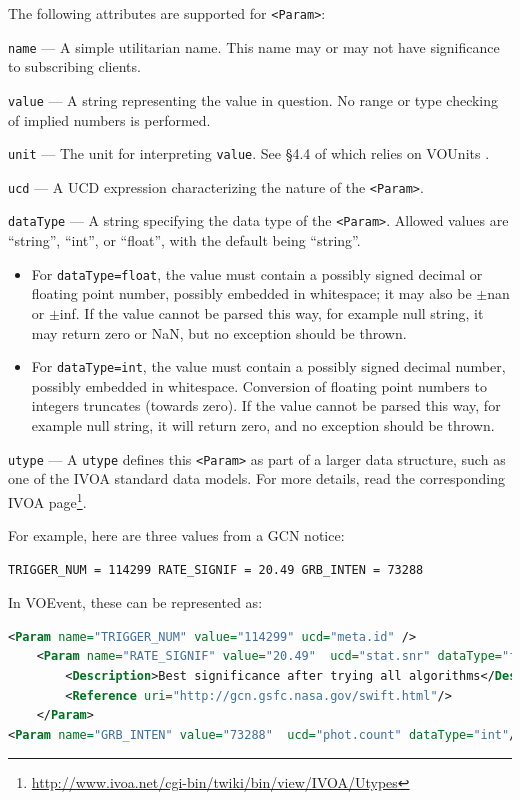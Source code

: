 \documentclass[11pt,a4paper]{ivoa}
\begin{document}
The following attributes are supported for {\tt <Param>}: 

 {\tt name}\label{sec:3.3.1.1} --- A simple utilitarian 
name. This name may or may not have significance to subscribing clients. 

 {\tt value}\label{sec:3.3.1.2} --- A string representing 
the value in question. No range or type checking of implied numbers is 
performed. 

 {\tt unit}\label{sec:3.3.1.3} --- The unit for 
interpreting {\tt value}. See \S4.4 of \citep{2019ivoa.spec.1021O}
which relies on VOUnits \citep{2014ivoa.spec.0523D}.

 {\tt ucd}\label{sec:3.3.1.4} --- A UCD 
\citep{2018ivoa.spec.0527M}
expression characterizing the nature of the {\tt <Param>}. 

 {\tt dataType}\label{sec:3.3.1.5} --- A string specifying 
the data type of the {\tt <Param>}. Allowed values are ``string'', ``int'', or 
``float'', with the default being ``string''. 
\begin{itemize}
\item For {\tt dataType=float}, the value must contain a possibly signed decimal 
or floating point number, possibly embedded in whitespace; it may also be 
$\pm$nan or $\pm$inf. If the value cannot be parsed this way, for example null 
string, it may return zero or NaN, but no exception should be thrown.
\item For {\tt dataType=int}, the value must contain a possibly signed decimal 
number, possibly embedded in whitespace. Conversion of floating point numbers to 
integers truncates (towards zero). If the value cannot be parsed this way, for 
example null string, it will return zero, and no exception should be thrown.
\end{itemize}

 {\tt utype}\label{sec:3.3.1.6} --- A {\tt utype} defines 
this {\tt <Param>} as part of a larger data structure, such as one of the IVOA 
standard data models. For more details, read the corresponding IVOA 
page\footnote{\url{http://www.ivoa.net/cgi-bin/twiki/bin/view/IVOA/Utypes}}. 

For example, here are three values from a GCN \citep{bib04} notice: 
\begin{lstlisting}[language=XML]
TRIGGER_NUM = 114299 RATE_SIGNIF = 20.49 GRB_INTEN = 73288 
\end{lstlisting}
In VOEvent, these can be represented as: 
\begin{lstlisting}[language=XML]
<Param name="TRIGGER_NUM" value="114299" ucd="meta.id" />
    <Param name="RATE_SIGNIF" value="20.49"  ucd="stat.snr" dataType="float">
        <Description>Best significance after trying all algorithms</Description>
        <Reference uri="http://gcn.gsfc.nasa.gov/swift.html"/>
    </Param>
<Param name="GRB_INTEN" value="73288"  ucd="phot.count" dataType="int"/> 
\end{lstlisting}
\end{document}

